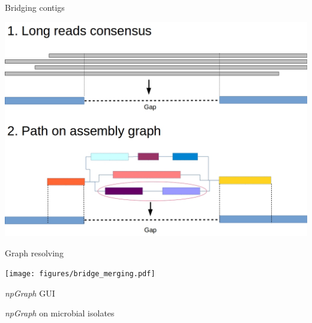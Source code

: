 \documentclass{beamer}
\begin{document}
\begin{frame}{Bridging contigs}
\begin{center}
 \includegraphics[height=.8\textheight]{gapfilling.jpg}  
\end{center}
\end{frame}
\begin{frame}{Graph resolving}
\begin{center}
 \texttt{[image: figures/bridge\_merging.pdf]}  
\end{center}
\end{frame}
\begin{frame}{\emph{npGraph} GUI}
\end{frame}
\begin{frame}{\emph{npGraph} on microbial isolates}
\end{frame}
\end{document}
